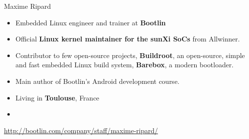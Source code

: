 \begin{frame}{Maxime Ripard}
    \begin{itemize}
	\item Embedded Linux engineer and trainer at {\bf Bootlin}
	\item Official {\bf Linux kernel maintainer for the sunXi SoCs}
	      from Allwinner.
	\item Contributor to few open-source projects, {\bf Buildroot}, an
	      open-source, simple and fast embedded Linux build system,
	     {\bf Barebox}, a modern bootloader.
	\item Main author of Bootlin's Android development course.
	\item Living in {\bf Toulouse}, France
	\item {}
    \end{itemize}
    {\small \url{http://bootlin.com/company/staff/maxime-ripard/}}
\end{frame}
